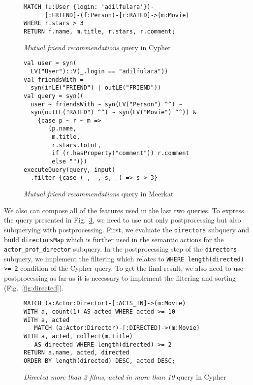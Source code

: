 \begin{figure}[!h]
\begin{lstlisting}
MATCH (u:User {login: 'adilfulara'})-
      [:FRIEND]-(f:Person)-[r:RATED]->(m:Movie)
WHERE r.stars > 3
RETURN f.name, m.title, r.stars, r.comment;
\end{lstlisting}
\caption{\emph{Mutual friend recommendations} query in Cypher}
\label{fig:Q4_C}
\end{figure}

\begin{figure}[h]
\begin{lstlisting}
val user = syn(
  LV("User")::V(_.login == "adilfulara"))
val friendsWith =
  syn(inLE("FRIEND") | outLE("FRIEND"))
val query = syn((
  user ~ friendsWith ~ syn(LV("Person") ^^) ~
  syn(outLE("RATED") ^^) ~ syn(LV("Movie") ^^)) &
    {case p ~ r ~ m =>
       (p.name,
        m.title,
        r.stars.toInt,
        if (r.hasProperty("comment")) r.comment
        else "")})
executeQuery(query, input)
  .filter {case (_, _, s, _) => s > 3}
\end{lstlisting}
\caption{\emph{Mutual friend recommendations} query in Meerkat}
\label{fig:Q4_M}
\end{figure} %

We also can compose all of the features used in the last two queries.
To express the query presented in Fig.~\ref{fig:Q3_C}, we need to use not only postprocessing but also subquerying with postprocessing.
First, we evaluate the \lstinline{directors} subquery and build \lstinline{directorsMap} which is further used in the semantic actions for the \lstinline{actor_prof_director} subquery.
In the postprocessing step of the \lstinline{directors} subquery, we implement the filtering which relates to \lstinline{WHERE length(directed) >= 2} condition of the Cypher query.
To get the final result, we also need to use postprocessing as far as it is necessary to implement the filtering and sorting (Fig.~\ref{fig:directed}).

\begin{figure}[]
\begin{lstlisting}
MATCH (a:Actor:Director)-[:ACTS_IN]->(m:Movie)
WITH a, count(1) AS acted WHERE acted >= 10
WITH a, acted
   MATCH (a:Actor:Director)-[:DIRECTED]->(m:Movie)
WITH a, acted, collect(m.title)
   AS directed WHERE length(directed) >= 2
RETURN a.name, acted, directed
ORDER BY length(directed) DESC, acted DESC;
\end{lstlisting}
\caption{\emph{Directed more than 2 films, acted in more than 10} query in Cypher}
\label{fig:Q3_C}
\end{figure}

